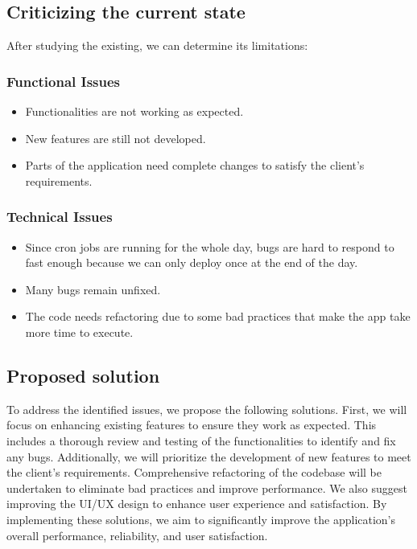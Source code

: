 \subsection{Criticizing the current state}
After studying the existing, we can determine its limitations:

\subsubsection{Functional Issues}
\begin{itemize}
    \item Functionalities are not working as expected.
    \item New features are still not developed.
    \item Parts of the application need complete changes to satisfy the client's requirements.
\end{itemize}

\subsubsection{Technical Issues}
\begin{itemize}
    \item Since cron jobs are running for the whole day, bugs are hard to respond to fast enough because we can only deploy once at the end of the day.
    \item Many bugs remain unfixed.
    \item The code needs refactoring due to some bad practices that make the app take more time to execute.
\end{itemize}

\subsection{Proposed solution}
To address the identified issues, we propose the following solutions. First, we will focus on enhancing existing features to ensure they work as expected. This includes a thorough review and testing of the functionalities to identify and fix any bugs. Additionally, we will prioritize the development of new features to meet the client's requirements. Comprehensive refactoring of the codebase will be undertaken to eliminate bad practices and improve performance. We also suggest improving the UI/UX design to enhance user experience and satisfaction. By implementing these solutions, we aim to significantly improve the application's overall performance, reliability, and user satisfaction.

